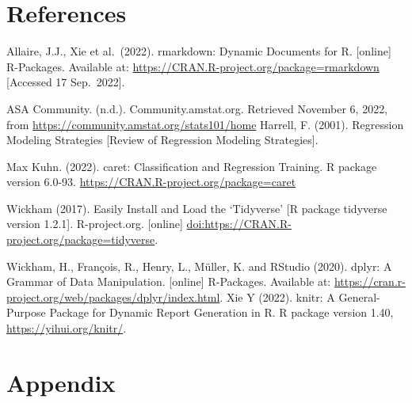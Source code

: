 \documentclass[letterpaper,8pt,twocolumn,twoside,]{pinp}
\begin{document}
\hypertarget{references}{%
\section{References}\label{references}}

Allaire, J.J., Xie et al.~(2022). rmarkdown: Dynamic Documents for R.
{[}online{]} R-Packages. Available at:
\url{https://CRAN.R-project.org/package=rmarkdown} {[}Accessed 17
Sep.~2022{]}.

ASA Community. (n.d.). Community.amstat.org. Retrieved November 6, 2022,
from \url{https://community.amstat.org/stats101/home} ‌Harrell, F.
(2001). Regression Modeling Strategies {[}Review of Regression Modeling
Strategies{]}.

Max Kuhn. (2022). caret: Classification and Regression Training. R
package version 6.0-93. \url{https://CRAN.R-project.org/package=caret}

Wickham (2017). Easily Install and Load the `Tidyverse' {[}R package
tidyverse version 1.2.1{]}. R-project.org. {[}online{]}
\url{doi:https://CRAN.R-project.org/package=tidyverse}.

Wickham, H., François, R., Henry, L., Müller, K. and RStudio (2020).
dplyr: A Grammar of Data Manipulation. {[}online{]} R-Packages.
Available at:
\url{https://cran.r-project.org/web/packages/dplyr/index.html}. Xie Y
(2022). knitr: A General-Purpose Package for Dynamic Report Generation
in R. R package version 1.40, \url{https://yihui.org/knitr/}.

\newpage

\hypertarget{appendix}{%
\section{Appendix}\label{appendix}}
\end{document}
